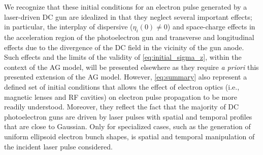We recognize that these initial conditions for an electron pulse generated by a laser-driven DC gun are idealized in that they neglect several important effects; in particular, the interplay of dispersive ($ \eta_{i}(0) \neq 0 $) and space-charge effects in the acceleration region of the photoelectron gun and transverse and longitudinal effects due to the divergence of the DC field in the vicinity of the gun anode.\cite{berger_dc_2009,togawa_ceb6_2007}
Such effects and the limits of the validity of \ref{eq:initial_sigma_z}, within the context of the AG model, will be presented elsewhere as they require \textit{a priori} this presented extension of the AG model.
However, \ref{eq:summary} also represent a defined set of initial conditions that allows the effect of electron optics (i.e., magnetic lenses and RF cavities) on electron pulse propagation to be more readily understood.
Moreover, they reflect the fact that the majority of DC photoelectron guns are driven by laser pulses with spatial and temporal profiles that are close to Gaussian.\cite{williamson_clocking_1997,sciaini_electronic_2009}
Only for specialized cases, such as the generation of uniform ellipsoid electron bunch shapes, is spatial and temporal manipulation of the incident laser pulse considered.\cite{luiten_how_2004,li_generating_2008}
